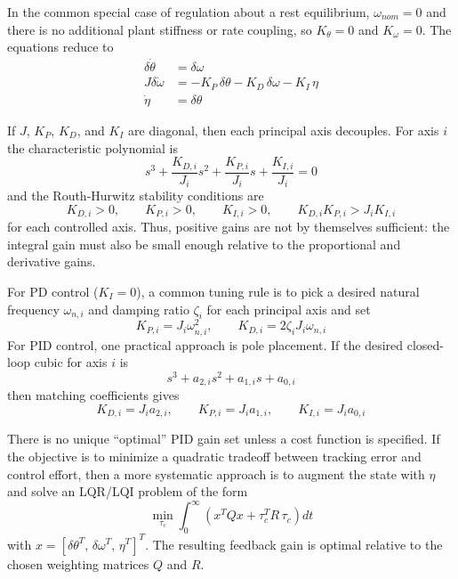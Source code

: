 \documentclass[11pt]{article}
\begin{document}
In the common special case of regulation about a rest equilibrium, $\omega_{nom} = 0$ and there is no additional plant stiffness or rate coupling, so $K_{\theta} = 0$ and $K_{\omega} = 0$. The equations reduce to
\begin{align}
    \delta\dot{\theta} &= \delta\omega \\
    J\delta\dot{\omega} &= -K_{P} \, \delta\theta - K_{D} \, \delta\omega - K_{I} \, \eta \\
    \dot{\eta} &= \delta\theta
\end{align}

If $J$, $K_{P}$, $K_{D}$, and $K_{I}$ are diagonal, then each principal axis decouples. For axis $i$ the characteristic polynomial is
\begin{equation}
    s^{3} + \frac{K_{D,i}}{J_{i}} s^{2} + \frac{K_{P,i}}{J_{i}} s + \frac{K_{I,i}}{J_{i}} = 0
\end{equation}
and the Routh-Hurwitz stability conditions are
\begin{equation}
    K_{D,i} > 0, \qquad K_{P,i} > 0, \qquad K_{I,i} > 0, \qquad K_{D,i} K_{P,i} > J_{i} K_{I,i}
\end{equation}
for each controlled axis. Thus, positive gains are not by themselves sufficient: the integral gain must also be small enough relative to the proportional and derivative gains.

For PD control ($K_{I} = 0$), a common tuning rule is to pick a desired natural frequency $\omega_{n,i}$ and damping ratio $\zeta_{i}$ for each principal axis and set
\begin{equation}
    K_{P,i} = J_{i} \omega_{n,i}^{2},
    \qquad
    K_{D,i} = 2 \zeta_{i} J_{i} \omega_{n,i}
\end{equation}
For PID control, one practical approach is pole placement. If the desired closed-loop cubic for axis $i$ is
\begin{equation}
    s^{3} + a_{2,i} s^{2} + a_{1,i} s + a_{0,i}
\end{equation}
then matching coefficients gives
\begin{equation}
    K_{D,i} = J_{i} a_{2,i},
    \qquad
    K_{P,i} = J_{i} a_{1,i},
    \qquad
    K_{I,i} = J_{i} a_{0,i}
\end{equation}

There is no unique ``optimal'' PID gain set unless a cost function is specified. If the objective is to minimize a quadratic tradeoff between tracking error and control effort, then a more systematic approach is to augment the state with $\eta$ and solve an LQR/LQI problem of the form
\begin{equation}
    \min_{\tau_{c}} \int_{0}^{\infty} \left( x^{T} Q x + \tau_{c}^{T} R \, \tau_{c} \right) dt
\end{equation}
with $x = [\delta\theta^{T}, \, \delta\omega^{T}, \, \eta^{T}]^{T}$. The resulting feedback gain is optimal relative to the chosen weighting matrices $Q$ and $R$.
\end{document}
